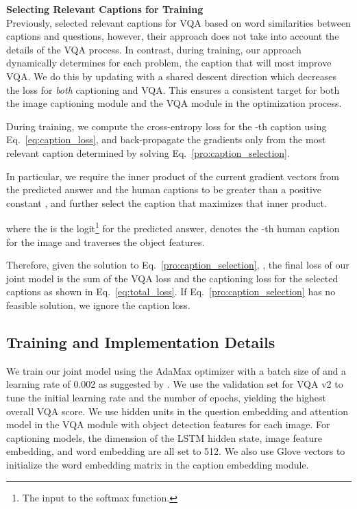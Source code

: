 \documentclass[11pt,a4paper]{article}
\begin{document}
\noindent\textbf{Selecting Relevant Captions for Training}\\
 Previously,  selected relevant captions for VQA based on word similarities between captions and questions, however, their approach does not take into account the details of the VQA process. In contrast, during training, our approach dynamically determines for each problem, the caption that will most improve VQA.  
We do this by updating with a shared descent direction \cite{wu2018dynamic} which decreases the loss for {\it both} captioning and VQA. This ensures a consistent target for both the image captioning module and the VQA module in the optimization process.

During training, we compute the cross-entropy loss for the -th caption using Eq.\ \ref{eq:caption_loss}, and back-propagate the gradients only from the most relevant caption determined by solving Eq.\ \ref{pro:caption_selection}. 

In particular, we require the inner product of the current gradient vectors from the predicted answer and the human captions to be greater than a positive constant , and further select the caption that maximizes that inner product. 

where the  is the logit\footnote{The input to the softmax function.} for the predicted answer,  denotes the -th human caption for the image and  traverses the  object features.

Therefore, given the solution to Eq.\ \ref{pro:caption_selection}, , the final loss of our joint model is the sum of the VQA loss and the captioning loss for the selected captions as shown in Eq.\ \ref{eq:total_loss}. If Eq.\ \ref{pro:caption_selection} has no feasible solution, we ignore the caption loss. \\



\subsection{Training and Implementation Details}
\label{sec:training}
We train our joint model using the AdaMax optimizer \cite{kingma2014adam} with a batch size of  and a learning rate of 0.002 as suggested by . We use the validation set for VQA v2 to tune the initial learning rate and the number of epochs, yielding the highest overall VQA score. We use  hidden units in the question embedding and attention model in the VQA module with  object detection features for each image. For captioning models, the dimension of the LSTM hidden state, image feature embedding, and word embedding are all set to 512. We also use Glove vectors \cite{pennington2014glove} to initialize the word embedding matrix in the caption embedding module.
\end{document}
